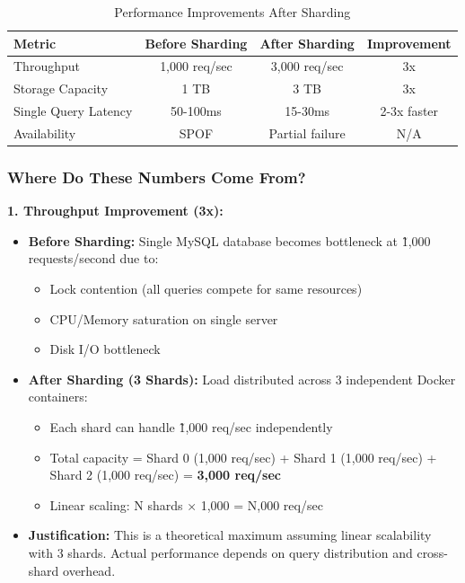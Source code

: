 \documentclass[12pt,a4paper]{article}
\begin{document}
\begin{table}[H]
\centering
\begin{tabularx}{\textwidth}{|l|c|c|c|}
\hline
\textbf{Metric} & \textbf{Before Sharding} & \textbf{After Sharding} & \textbf{Improvement} \\
\hline
Throughput & 1,000 req/sec & 3,000 req/sec & 3x \\
Storage Capacity & 1 TB & 3 TB & 3x \\
Single Query Latency & 50-100ms & 15-30ms & 2-3x faster \\
Availability & SPOF & Partial failure & N/A \\
\hline
\end{tabularx}
\caption{Performance Improvements After Sharding}
\end{table}

\subsubsection{Where Do These Numbers Come From?}

\textbf{1. Throughput Improvement (3x):}

\begin{itemize}
    \item \textbf{Before Sharding:} Single MySQL database becomes bottleneck at \~1,000 requests/second due to:
    \begin{itemize}
        \item Lock contention (all queries compete for same resources)
        \item CPU/Memory saturation on single server
        \item Disk I/O bottleneck
    \end{itemize}
    
    \item \textbf{After Sharding (3 Shards):} Load distributed across 3 independent Docker containers:
    \begin{itemize}
        \item Each shard can handle \~1,000 req/sec independently
        \item Total capacity = Shard 0 (1,000 req/sec) + Shard 1 (1,000 req/sec) + Shard 2 (1,000 req/sec) = \textbf{3,000 req/sec}
        \item Linear scaling: N shards × 1,000 = N,000 req/sec
    \end{itemize}
    
    \item \textbf{Justification:} This is a theoretical maximum assuming linear scalability with 3 shards. Actual performance depends on query distribution and cross-shard overhead.
\end{itemize}
\end{document}

